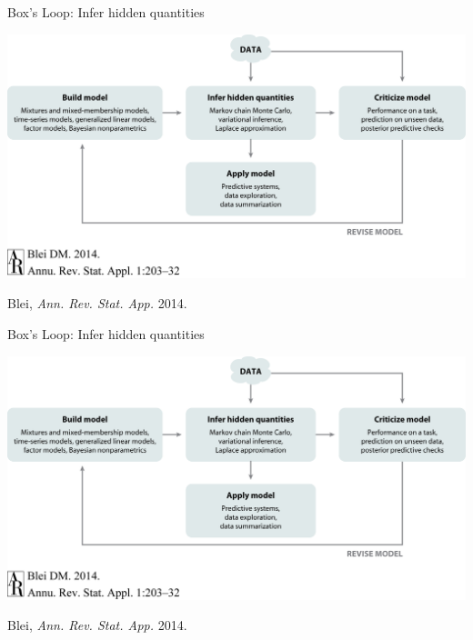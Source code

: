 \documentclass[aspectratio=169]{beamer}
\begin{document}
\begin{frame}{Box's Loop: Infer hidden quantities}
\begin{center}
\includegraphics[width=.85\linewidth]{figures/lap1/boxsloop.jpeg}\\
\end{center} 
\begin{flushright}
{\footnotesize Blei, \textit{Ann. Rev. Stat. App.} 2014.}
\end{flushright}
\end{frame}

\begin{frame}{Box's Loop: Infer hidden quantities}
\begin{center}
\includegraphics[width=.85\linewidth]{figures/lap1/boxsloop.jpeg}\\
\end{center} 
\begin{flushright}
{\footnotesize Blei, \textit{Ann. Rev. Stat. App.} 2014.}
\end{flushright}
\end{frame}
\end{document}
